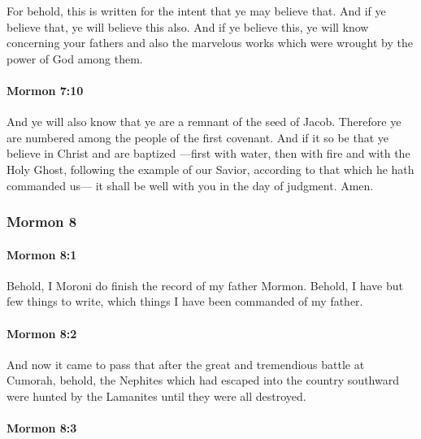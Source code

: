			For behold, this is written for the intent that ye may believe that.
			And if ye believe that,
			ye will believe this also.
			And if ye believe this,
			ye will know concerning your fathers and also the marvelous works
			which were wrought by the power of God among them.

		\paragraph{Mormon 7:10} %
			\label{MORMON-7-10}

			And ye will also know that ye are a remnant of the seed of Jacob.
			Therefore ye are numbered among the people of the first covenant.
			And if it so be that ye believe in Christ and are baptized
			---first with water, then with fire and with the Holy Ghost,
			following the example of our Savior,
			according to that which he hath commanded us---
			it shall be well with you in the day of judgment.
			Amen.

	\subsubsection{Mormon 8} %
		\label{MORMON-8}
		
		\paragraph{Mormon 8:1} %
			\label{MORMON-8-1}

			Behold, I Moroni do finish the record of my father Mormon.
			Behold, I have but few things to write,
			which things I have been commanded of my father.

		\paragraph{Mormon 8:2} %
			\label{MORMON-8-2}

			And now it came to pass that after the great and tremendious battle at Cumorah,
			behold, the Nephites which had escaped into the country southward
			were hunted by the Lamanites until they were all destroyed.

		\paragraph{Mormon 8:3} %
			\label{MORMON-8-3}

